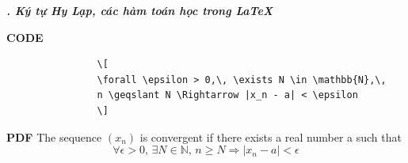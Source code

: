 \documentclass[11pt]{beamer}
\newcounter{group}
\begin{document}
	\begin{frame}[fragile]{\textbf{\textit{\thegroup. Ký tự Hy Lạp, các hàm toán học trong \LaTeX}}}
		\begin{block}{\textbf{CODE}}
			\begin{verbatim}
				\[
				\forall \epsilon > 0,\, \exists N \in \mathbb{N},\,
				n \geqslant N \Rightarrow |x_n - a| < \epsilon
				\]
			\end{verbatim}
		\end{block}
		\begin{block}{\textbf{PDF}}
			The sequence $(x_n)$ is convergent if there exists a real number a such that
			\[
				\forall \epsilon > 0,\, \exists N \in \mathbb{N},\, n \geqslant N \Rightarrow |x_n - a| < \epsilon
			\]
		\end{block}
	\end{frame}
\end{document}
